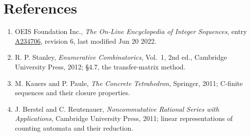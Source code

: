 \documentclass[11pt]{article}
\theoremstyle{definition}
\begin{document}
\section{References}

\begin{enumerate}

\item OEIS Foundation Inc., \emph{The On-Line Encyclopedia of Integer Sequences}, entry \href{https://oeis.org/A234706}{A234706}, revision 6, last modified Jun 20 2022.

\item R. P. Stanley, \emph{Enumerative Combinatorics}, Vol.~1, 2nd ed., Cambridge University Press, 2012; \S4.7, the transfer-matrix method.

\item M. Kauers and P. Paule, \emph{The Concrete Tetrahedron}, Springer, 2011; C-finite sequences and their closure properties.

\item J. Berstel and C. Reutenauer, \emph{Noncommutative Rational Series with Applications}, Cambridge University Press, 2011; linear representations of counting automata and their reduction.

\end{enumerate}
\end{document}

